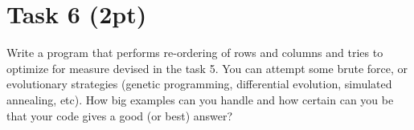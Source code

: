 \documentclass{article}
\begin{document}
\section*{Task 6 (2pt)}
Write a program that performs re-ordering of rows and columns and tries to optimize for measure devised in the task 5. You can attempt some brute force, or evolutionary strategies (genetic programming, differential evolution, simulated annealing, etc). How big examples can you handle and how certain can you be that your code gives a good (or best) answer?
\end{document}
